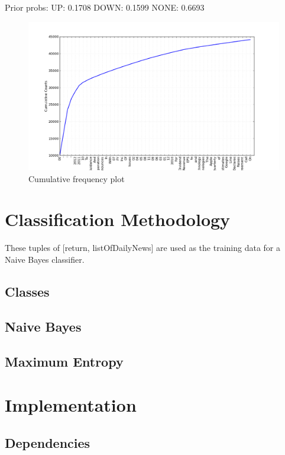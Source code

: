 \documentclass[twocolumn]{article}
\begin{document}
Prior probs:
UP: 0.1708
DOWN: 0.1599
NONE:  0.6693

\begin{figure}[h!]
\centering
\includegraphics[scale=0.25]{cum_graph.png}
\caption{Cumulative frequency plot}
\end{figure}
\section{Classification Methodology}
These tuples of [return, listOfDailyNews] are used as the training data for a Naive Bayes classifier. 
\subsection{Classes}

\subsection{Naive Bayes}
\subsection{Maximum Entropy}

\section{Implementation}

\subsection{Dependencies}
\end{document}
